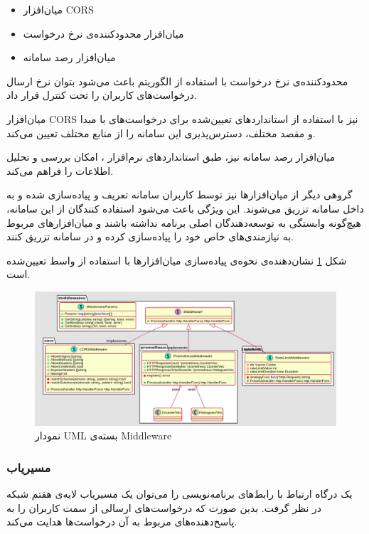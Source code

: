 \begin{itemize}
    \item میان‌افزار CORS
    \item میان‌افزار محدود‌کننده‌ی نرخ درخواست 
    \item میان‌افزار رصد سامانه
\end{itemize}

محدود‌کننده‌ی نرخ درخواست با استفاده از الگوریتم 
\cite{tokenbucket}
باعث می‌شود بتوان نرخ ارسال درخواست‌های کاربران را تحت کنترل قرار داد.

میان‌افزار CORS
\cite{cors}
نیز با استفاده از استاندارد‌های تعیین‌شده برای درخواست‌های با مبدا و مقصد مختلف، دسترس‌پذیری این سامانه‌ را از منابع مختلف تعیین می‌کند.

میان‌افزار رصد سامانه نیز، طبق استاندارد‌های نرم‌افزار ،
\cite{prometheus}
امکان بررسی و تحلیل اطلاعات را فراهم می‌کند.

گروهی دیگر از میان‌افزار‌ها نیز توسط کاربران سامانه تعریف و پیاده‌سازی شده و به داخل سامانه تزریق می‌شوند. این ویژگی باعث می‌شود استفاده کنندگان از این سامانه، هیچ‌گونه وابستگی به توسعه‌دهندگان اصلی برنامه نداشته باشند و میان‌افزار‌های مربوط‌ به نیازمندی‌های خاص خود را پیاده‌سازی کرده و در سامانه تزریق کنند.

شکل
\ref{middlewares_package}
نشان‌دهنده‌ی نحوه‌ی پیاده‌سازی میان‌افزار‌ها با استفاده از واسط تعیین‌شده است.

\begin{figure}[H]
    \centering
    \caption{نمودار UML بسته‌ی Middleware}
    \label{middlewares_package}
    \includegraphics[scale=0.2]{images/Middleware.png}
\end{figure}

\subsubsection{مسیریاب}\label{subsec:impl_router}
یک درگاه ارتباط با رابط‌های برنامه‌نویسی را می‌توان یک مسیریاب لایه‌ی هفتم شبکه در نظر گرفت. بدین صورت که درخواست‌های ارسالی از سمت کاربران را به پاسخ‌دهنده‌های مربوط به آن‌ درخواست‌ها هدایت می‌کند.

